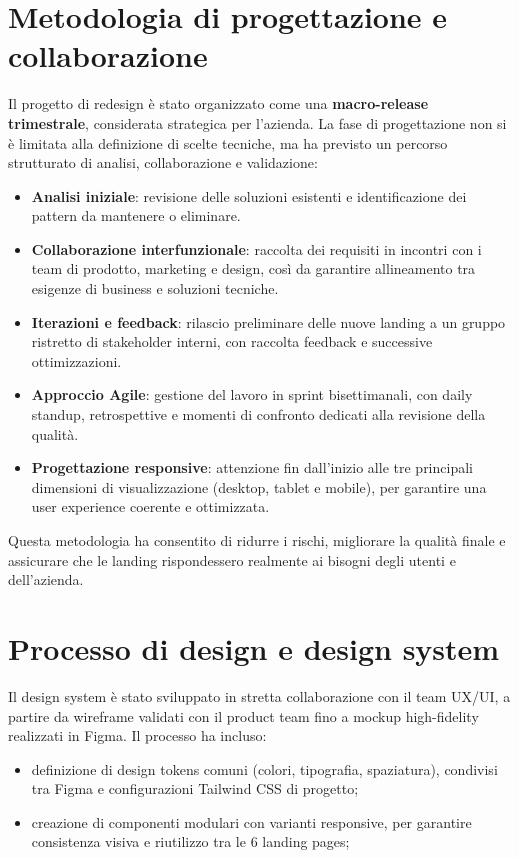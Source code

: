 \section{Metodologia di progettazione e collaborazione} 
Il progetto di redesign è stato organizzato come una \textbf{macro-release trimestrale},
considerata strategica per l'azienda. La fase di progettazione non si è limitata
alla definizione di scelte tecniche, ma ha previsto un percorso strutturato di
analisi, collaborazione e validazione:

\begin{itemize}
  \item \textbf{Analisi iniziale}: revisione delle soluzioni esistenti e
  identificazione dei pattern da mantenere o eliminare.
  \item \textbf{Collaborazione interfunzionale}: raccolta dei requisiti in
  incontri con i team di prodotto, marketing e design, così da garantire
  allineamento tra esigenze di business e soluzioni tecniche.
  \item \textbf{Iterazioni e feedback}: rilascio preliminare delle nuove landing
  a un gruppo ristretto di stakeholder interni, con raccolta feedback e successive
  ottimizzazioni.
  \item \textbf{Approccio Agile}: gestione del lavoro in sprint bisettimanali,
  con daily standup, retrospettive e momenti di confronto dedicati alla revisione
  della qualità.
  \item \textbf{Progettazione responsive}: attenzione fin dall'inizio alle tre
  principali dimensioni di visualizzazione (desktop, tablet e mobile), per
  garantire una user experience coerente e ottimizzata.
\end{itemize}

Questa metodologia ha consentito di ridurre i rischi, migliorare la qualità
finale e assicurare che le landing rispondessero realmente ai bisogni degli utenti
e dell'azienda.

\section{Processo di design e design system}
Il design system è stato sviluppato in stretta collaborazione con il team UX/UI,
a partire da wireframe validati con il product team fino a mockup
high-fidelity realizzati in Figma. Il processo ha incluso:

\begin{itemize}
  \item definizione di design tokens comuni (colori, tipografia, spaziatura),
  condivisi tra Figma e configurazioni Tailwind CSS di progetto;
  \item creazione di componenti modulari con varianti responsive, per garantire 
  consistenza visiva e riutilizzo tra le 6 landing pages;
\end{itemize}


